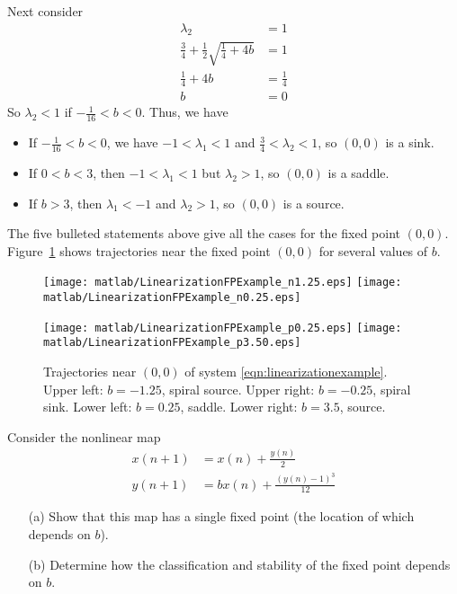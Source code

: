 \begin{xexample}
Next consider
\begin{equation}
\begin{split}
   \lambda_2 & = 1 \\
   \frac{3}{4} + \frac{1}{2} \sqrt{\frac{1}{4}+4b} & = 1 \\
   \frac{1}{4}+4b & = \frac{1}{4} \\
   b & = 0
\end{split}
\end{equation}
So $\lambda_2 < 1$ if $-\frac{1}{16} < b < 0$.
Thus, we have
\begin{itemize}
\item
If $-\frac{1}{16} < b < 0$, we have $-1 < \lambda_1 < 1$ and $\frac{3}{4} < \lambda_2 < 1$, so
$(0,0)$ is a sink.
\item
If $0 < b < 3$, then $-1 < \lambda_1 < 1$ but $\lambda_2 > 1$, so 
$(0,0)$ is a saddle.
\item
If $b > 3$, then $\lambda_1 < -1$ and $\lambda_2 > 1$, so
$(0,0)$ is a source.
\end{itemize}
The five bulleted statements above give all the cases for the
fixed point $(0,0)$.
Figure~\ref{fig:LinearizationFPExamples} shows trajectories
near the fixed point $(0,0)$ for several values of $b$.
\begin{figure}
\centerline{%
\texttt{[image: matlab/LinearizationFPExample\_n1.25.eps]}
\texttt{[image: matlab/LinearizationFPExample\_n0.25.eps]}
}
\centerline{%
\texttt{[image: matlab/LinearizationFPExample\_p0.25.eps]}
\texttt{[image: matlab/LinearizationFPExample\_p3.50.eps]}
}
\caption{Trajectories near $(0,0)$ of system
\eqref{eqn:linearizationexample}. Upper left: $b=-1.25$, spiral source.
Upper right: $b=-0.25$, spiral sink.
Lower left: $b=0.25$, saddle.
Lower right: $b=3.5$, source.}
\label{fig:LinearizationFPExamples}
\end{figure}
\end{xexample}

\newpage

\begin{exercises}
\begin{exercise}
Consider the nonlinear map
\begin{equation}
\begin{split}
  x(n+1) & = x(n) + \frac{y(n)}{2} \\
  y(n+1) & = bx(n) + \frac{(y(n)-1)^3}{12}
\end{split}
\end{equation}
\begin{enumerate}
\item[(a)]
Show that this map has a single fixed point
(the location of which depends on $b$).
\item[(b)]
Determine how the classification and stability
of the fixed point depends on $b$.
\end{enumerate}
\end{exercise}
\end{exercises}

